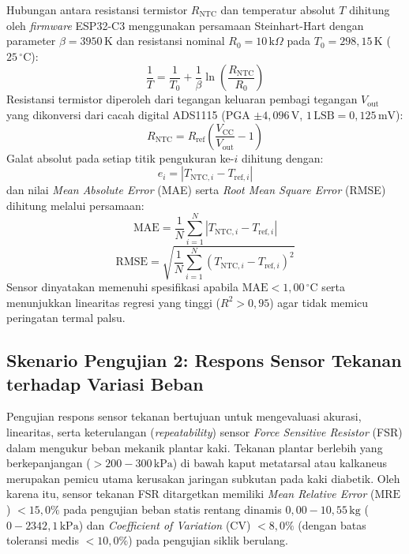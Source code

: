 Hubungan antara resistansi termistor $R_{\mathrm{NTC}}$ dan temperatur absolut $T$ dihitung oleh \textit{firmware} ESP32-C3 menggunakan persamaan Steinhart-Hart dengan parameter $\beta = 3950\,\mathrm{K}$ dan resistansi nominal $R_0 = 10\,\mathrm{k}\Omega$ pada $T_0 = 298{,}15\,\mathrm{K}$ ($25\,^\circ\mathrm{C}$):
\begin{equation}
\frac{1}{T} = \frac{1}{T_0} + \frac{1}{\beta}\ln\left(\frac{R_{\mathrm{NTC}}}{R_0}\right)
\end{equation}
Resistansi termistor diperoleh dari tegangan keluaran pembagi tegangan $V_{\mathrm{out}}$ yang dikonversi dari cacah digital ADS1115 (PGA $\pm 4{,}096\,\mathrm{V}$, $1\,\mathrm{LSB} = 0{,}125\,\mathrm{mV}$):
\begin{equation}
R_{\mathrm{NTC}} = R_{\mathrm{ref}} \left(\frac{V_{\mathrm{CC}}}{V_{\mathrm{out}}} - 1\right)
\end{equation}
Galat absolut pada setiap titik pengukuran ke-$i$ dihitung dengan:
\begin{equation}
e_i = \left|T_{\mathrm{NTC},i}-T_{\mathrm{ref},i}\right|
\end{equation}
dan nilai \textit{Mean Absolute Error} (MAE) serta \textit{Root Mean Square Error} (RMSE) dihitung melalui persamaan:
\begin{equation}
\mathrm{MAE} = \frac{1}{N}\sum_{i=1}^{N}\left|T_{\mathrm{NTC},i}-T_{\mathrm{ref},i}\right|
\end{equation}
\begin{equation}
\mathrm{RMSE} = \sqrt{\frac{1}{N}\sum_{i=1}^{N}\left(T_{\mathrm{NTC},i}-T_{\mathrm{ref},i}\right)^2}
\end{equation}
Sensor dinyatakan memenuhi spesifikasi apabila $\mathrm{MAE} < 1{,}00\,^\circ\mathrm{C}$ serta menunjukkan linearitas regresi yang tinggi ($R^2 > 0{,}95$) agar tidak memicu peringatan termal palsu.

\subsection{Skenario Pengujian 2: Respons Sensor Tekanan terhadap Variasi Beban}
\label{subsec:Skenario2}

Pengujian respons sensor tekanan bertujuan untuk mengevaluasi akurasi, linearitas, serta keterulangan (\textit{repeatability}) sensor \textit{Force Sensitive Resistor} (FSR) dalam mengukur beban mekanik plantar kaki. Tekanan plantar berlebih yang berkepanjangan ($> 200 - 300\,\mathrm{kPa}$) di bawah kaput metatarsal atau kalkaneus merupakan pemicu utama kerusakan jaringan subkutan pada kaki diabetik. Oleh karena itu, sensor tekanan FSR ditargetkan memiliki \textit{Mean Relative Error} ($\text{MRE}$) $< 15{,}0\%$ pada pengujian beban statis rentang dinamis $0{,}00 - 10{,}55\,\mathrm{kg}$ ($0 - 2342{,}1\,\mathrm{kPa}$) dan \textit{Coefficient of Variation} ($\text{CV}$) $< 8{,}0\%$ (dengan batas toleransi medis $< 10{,}0\%$) pada pengujian siklik berulang.

